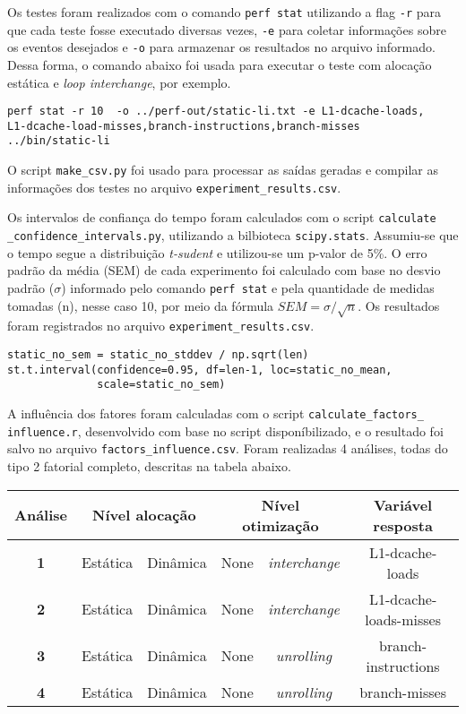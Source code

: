 Os testes foram realizados com o comando \texttt{perf stat} utilizando a flag \texttt{-r} para que cada teste fosse executado diversas vezes, \texttt{-e} para coletar informações sobre os eventos desejados e \texttt{-o} para armazenar os resultados no arquivo informado. Dessa forma, o comando abaixo foi usada para executar o teste com alocação estática e \textit{loop interchange}, por exemplo.

\begin{verbatim}
perf stat -r 10  -o ../perf-out/static-li.txt -e L1-dcache-loads,
L1-dcache-load-misses,branch-instructions,branch-misses
../bin/static-li
\end{verbatim}

O script \texttt{make\_csv.py} foi usado para processar as saídas geradas e compilar as informações dos testes no arquivo \texttt{experiment\_results.csv}.

Os intervalos de confiança do tempo foram calculados com o script \texttt{calculate} \texttt{\_confidence\_intervals.py}, utilizando a bilbioteca \texttt{scipy.stats}. Assumiu-se que o tempo segue a distribuição \textit{t-sudent} e utilizou-se um p-valor de 5\%. O erro padrão da média (SEM) de cada experimento foi calculado com base no desvio padrão ($\sigma$) informado pelo comando \texttt{perf stat} e pela quantidade de medidas tomadas (n), nesse caso 10, por meio da fórmula $SEM = \sigma / \sqrt{n}$. Os resultados foram registrados no arquivo \texttt{experiment\_results.csv}.

\begin{verbatim}
static_no_sem = static_no_stddev / np.sqrt(len)
st.t.interval(confidence=0.95, df=len-1, loc=static_no_mean, 
              scale=static_no_sem)
\end{verbatim}

A influência dos fatores foram calculadas com o script \texttt{calculate\_factors\_} \texttt{influence.r}, desenvolvido com base no script disponíbilizado, e o resultado foi salvo no arquivo \texttt{factors\_influence.csv}. Foram realizadas 4 análises, todas do tipo 2 fatorial completo, descritas na tabela abaixo.  

\begin{table}[H]
\centering
\begin{tabular}{|c|c|c|c|c|c|}
    \hline Análise & \multicolumn{2}{c|}{\textbf{Nível alocação}} & \multicolumn{2}{c|}{\textbf{Nível otimização}} & \textbf{Variável resposta} \\
    \hline \textbf{1} & Estática & Dinâmica & None & \textit{interchange} & L1-dcache-loads \\
    \hline \textbf{2} & Estática & Dinâmica & None & \textit{interchange} & L1-dcache-loads-misses \\
    \hline \textbf{3} & Estática & Dinâmica & None & \textit{unrolling} & branch-instructions \\
    \hline \textbf{4} & Estática & Dinâmica & None & \textit{unrolling} & branch-misses \\
    \hline
\end{tabular}
\end{table}
    
